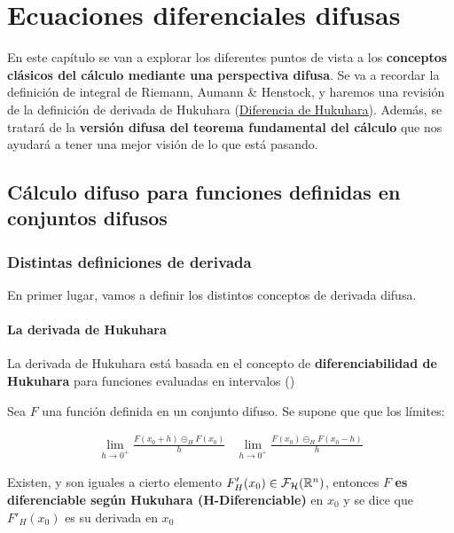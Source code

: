 
\chapter{Ecuaciones diferenciales difusas}
En este capítulo se van a explorar los diferentes puntos de vista a los \textbf{conceptos clásicos del cálculo mediante una perspectiva difusa}. Se va a recordar la definición de integral de Riemann, Aumann \& Henstock, y haremos una revisión de la definición de derivada de Hukuhara (\hyperref[def:hukukara]{Diferencia de Hukuhara}). Además, se tratará de la \textbf{versión difusa del teorema fundamental del cálculo} que nos ayudará a tener una mejor visión de lo que está pasando.

\section{Cálculo difuso para funciones definidas en conjuntos difusos}
\subsection{Distintas definiciones de derivada}
En primer lugar, vamos a definir los distintos conceptos de derivada difusa.

\subsubsection{La derivada de Hukuhara}
La derivada de Hukuhara está basada en el concepto de \textbf{diferenciabilidad de Hukuhara} para funciones evaluadas en intervalos (\cite{derivatehukuhara})

\begin{definicion}
	Sea $F$ una función definida en un conjunto difuso. Se supone que que los límites:
	
	\[
		\begin{array}{c||c}
			\lim\limits_{h \rightarrow 0^+} \frac{F(x_0 + h) \circleddash_H F(x_0)}{h} & \lim\limits_{h \rightarrow 0^+} \frac{F(x_0) \circleddash_H F(x_0 - h)}{h}
		\end{array}
	\]
	
	Existen, y son iguales a cierto elemento $F'_H(x_0) \in \mathcal{F}_\mathcal{H}(\mathbb R^n)$, entonces $F$ \textbf{es diferenciable según Hukuhara (H-Diferenciable)} en $x_0$ y se dice que $F'_H(x_0)$ es su derivada en $x_0$ 
\end{definicion}

